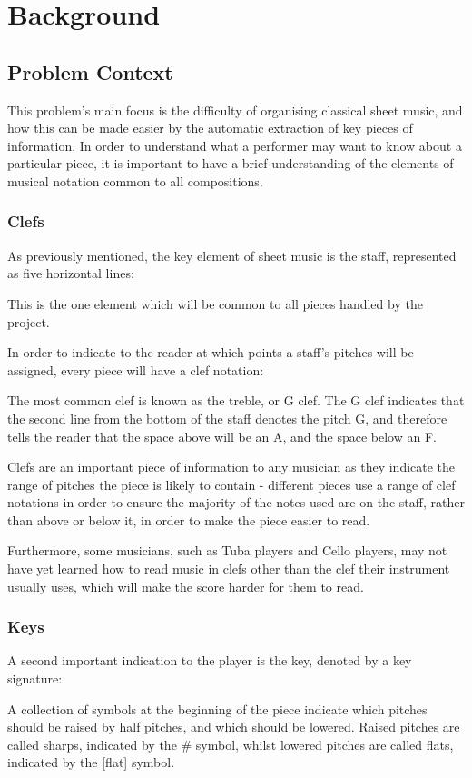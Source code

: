 \section{Background}
\subsection{Problem Context}
This problem's main focus is the difficulty of organising classical sheet music, and how this can be made easier by the automatic extraction of key pieces  of information. In order to understand what a performer may want to know about a particular piece, it is important to have a brief understanding of the elements of musical notation common to all compositions.
\subsubsection{Clefs}
As previously mentioned, the key element of sheet music is the staff, represented as five horizontal lines:

This is the one element which will be common to all pieces handled by the project. 

In order to indicate to the reader at which points a staff's pitches will be assigned, every piece will have a clef notation:

The most common clef is known as the treble, or G clef. The G clef indicates that the second line from the bottom of the staff denotes the pitch G, and therefore tells the reader that the space above will be an A, and the space below an F.

Clefs are an important piece of information to any musician as they indicate the range of pitches the piece is likely to contain - different pieces use a range of clef notations in order to ensure the majority of the notes used are on the staff, rather than above or below it, in order to make the piece easier to read. 

Furthermore, some musicians, such as Tuba players and Cello players, may not have yet learned how to read music in clefs other than the clef their instrument usually uses, which will make the score harder for them to read.

\subsubsection{Keys}
A second important indication to the player is the key, denoted by a key signature:

A collection of symbols at the beginning of the piece indicate which pitches should be raised by half pitches, and which should be lowered. Raised pitches are called sharps, indicated by the \# symbol, whilst lowered pitches are called flats, indicated by the [flat] symbol.

